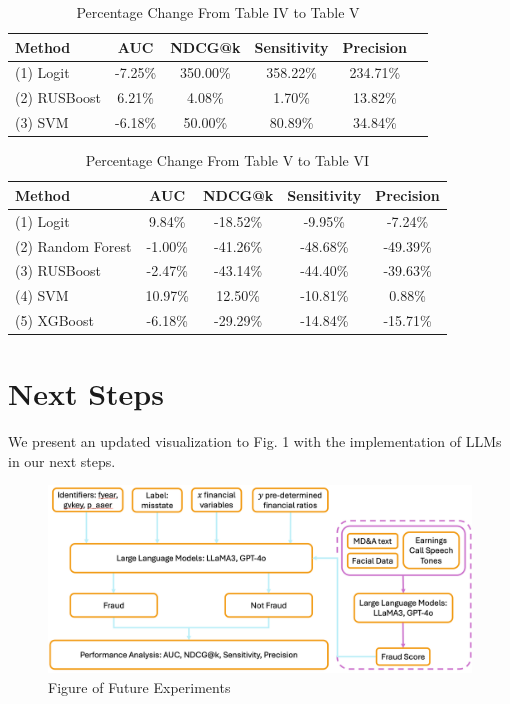 \documentclass[conference]{IEEEtran}
\begin{document}
\begin{table}[H]
\caption{Percentage Change From Table IV to Table V}
\centering
\begin{tabular}{p{2.295cm}ccccc}
\toprule
\textbf{Method} & \textbf{AUC} & \textbf{NDCG@k} & \textbf{Sensitivity} & \textbf{Precision} \\
\midrule
\raggedright (1) Logit & -7.25\% & 350.00\% & 358.22\% & 234.71\% \\
\raggedright (2) RUSBoost & 6.21\% & 4.08\% & 1.70\% & 13.82\% \\
\raggedright (3) SVM & -6.18\% & 50.00\% & 80.89\% & 34.84\% \\

\bottomrule
\end{tabular}
\end{table}

\begin{table}[H]
\caption{Percentage Change From Table V to Table VI}
\centering
\begin{tabular}{p{2.295cm}cccc}
\toprule
\textbf{Method} & \textbf{AUC} & \textbf{NDCG@k} & \textbf{Sensitivity} & \textbf{Precision} \\
\midrule
\raggedright (1) Logit & 9.84\% & -18.52\% & -9.95\% & -7.24\% \\
\raggedright (2) Random Forest & -1.00\% & -41.26\% & -48.68\% & -49.39\% \\
\raggedright (3) RUSBoost & -2.47\% & -43.14\% & -44.40\% & -39.63\% \\
\raggedright (4) SVM & 10.97\% & 12.50\% & -10.81\% & 0.88\% \\
\raggedright (5) XGBoost & -6.18\% & -29.29\% & -14.84\% & -15.71\% \\
\bottomrule
\end{tabular}
\label{tab:performance}
\end{table} \vspace{0.1pt}

\section{Next Steps} We present an updated visualization to Fig. 1 with the implementation of LLMs in our next steps. \vspace{15pt}\begin{figure}[H]
	\centerline{\includegraphics[width=\columnwidth]{llmmethod}}
	\caption{Figure of Future Experiments}
	\label{fig}
	\end{figure} \vspace{15pt}
\end{document}
